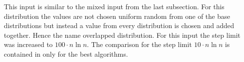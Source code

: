 This input is similar to the mixed input from the last subsection.
For this distribution the values are not chosen uniform random from one of the base distributions but instead a value from every distribution is chosen and added together.
Hence the name overlapped distribution.
For this input the step limit was increased to $100\cdot n \ln n$.
The comparison for the step limit $10\cdot n \ln n$ is contained in only for the best algorithms.